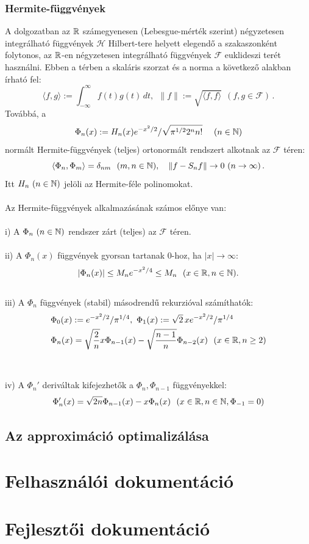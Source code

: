 \documentclass[oneside,titlepage,12pt,a4paper]{report}
\begin{document}
\subsection{Hermite-függvények}
A dolgozatban  az $\Bbb R$ számegyenesen (Lebesgue-mérték szerint) négyzetesen integrálható függvények $\mathcal H$ Hilbert-tere helyett elegendő a szakaszonként folytonos, az $\Bbb R$-en  négyzetesen integrálható függvények $\mathcal F$ euklideszi terét használni. Ebben a térben a skaláris szorzat és a norma a következő alakban írható fel:
\begin{equation}
 \langle f,g\rangle:=\int_{-\infty}^\infty f(t)g(t)\, dt,\ \ \|f\|:=\sqrt{\langle f,f\rangle}\ \ (f,g\in\mathcal F)\,.
\label{eq:dotprod}
\end{equation}
Továbbá, a
 \begin{equation*}
 \Phi_n(x):=H_n(x)e^{-x^2/2}/\sqrt{\pi^{1/2}2^n n!}\quad \ (n\in\Bbb N)
 \end{equation*}
normált Hermite-függvények (teljes) ortonormált rendszert alkotnak az $\mathcal F$ téren:
  \begin{equation*}
   \langle \Phi_n,\Phi_m\rangle=\delta_{nm}\ \ (m,n\in\Bbb N),\quad
  \|f-S_nf\|\to 0\ (n\to\infty)\,.
   \end{equation*}
Itt $H_n\ (n\in\Bbb N)$ jelöli az Hermite-féle polinomokat.
\\
\\
Az Hermite-függvények alkalmazásának számos előnye van: \\
\\
i) A $\Phi_n\ (n\in\Bbb N)$ rendszer zárt (teljes) az $\mathcal F$ téren. \\
\\
ii) A $\Phi_n(x)$ függvények gyorsan tartanak $0$-hoz, ha $|x|\to \infty$: \\
$$
|\Phi_n(x)|\le M_n e^{-x^2/4}\le M_n\ \ (x\in\Bbb R, n\in\Bbb N).
$$
\\
iii) A $\Phi_n$ függvények (stabil) másodrendű rekurzióval számíthatók: \\
\begin{equation}
\begin{split}
&\Phi_0(x):=e^{-x^2/2}/\pi^{1/4},\ \Phi_1(x):=\sqrt{2}\, x e^{-x^2/2}/\pi^{1/4}\\
&\Phi_n(x)=\sqrt{\frac 2 n} x \Phi_{n-1}(x)-\sqrt{\frac{n-1}n}\Phi_{n-2}(x)\ \ (x\in\Bbb R, n\ge 2)
\end{split}
\end{equation} 
\\
\\
iv) A $\Phi_n'$ deriváltak kifejezhetők a $\Phi_n, \Phi_{n-1} $ függvényekkel: \\
\begin{equation}
\Phi_n'(x)=\sqrt{2n}\Phi_{n-1}(x)-x\Phi_n(x)\ \ (x\in\Bbb R, n\in\Bbb N,\Phi_{-1}=0)
\end{equation}

\section{Az approximáció optimalizálása}

\chapter{Felhasználói dokumentáció}

\chapter{Fejlesztői dokumentáció}
\end{document}
